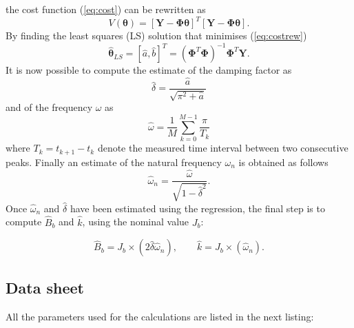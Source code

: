 the cost function (\ref{eq:cost}) can be rewritten as
\begin{equation}
\label{eq:costrew}
     V(\boldsymbol{\theta}) = [\boldsymbol{Y}-\boldsymbol{\Phi}\boldsymbol{\theta}]^T[\boldsymbol{Y}-\boldsymbol{\Phi}\boldsymbol{\theta}].
\end{equation}
By finding the least squares (LS) solution that minimises (\ref{eq:costrew})
\begin{equation}
    \boldsymbol{\hat{\theta}}_{LS} = [\hat{a}, \hat{b}]^T = (\boldsymbol{\Phi}^T\boldsymbol{\Phi})^{-1}\boldsymbol{\Phi}^T\boldsymbol{Y}.
\end{equation}
It is now possible to compute the estimate of the damping factor as
\begin{equation}
    \hat{\delta}=\frac{\hat{a}}{\sqrt{\pi^2 + \hat{a}}} 
\end{equation}
and of the frequency \(\omega\) as
\begin{equation}
    \hat{\omega} = \frac{1}{M} \sum_{k=0}^{M-1} \frac{\pi}{T_k}
\end{equation}
where \(T_k = t_{k+1}-t_k\) denote the measured
time interval between two consecutive peaks.
Finally an estimate of the natural frequency \(\omega_n\) is obtained as follows
\begin{equation}
    \hat{\omega}_n = \frac{\hat{\omega}}{\sqrt{1-\hat{\delta}^2}}.
\end{equation}
Once \(\hat{\omega}_n\) and \(\hat{\delta}\) have been estimated using the regression, the final step is to compute \(\hat{B}_b\) and \(\hat{k}\), using the nominal value \(J_b\):

 \begin{equation}
    \label{eq : params}
        \hat{B}_b = J_b\times(2\hat{\delta}\hat{\omega}_n), \qquad 
        \hat{k} = J_b\times(\hat{\omega}_n).
    \end{equation}

\subsection{Data sheet}
All the parameters used for the calculations are listed in the next listing:




